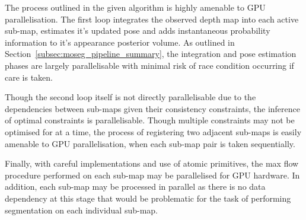 {\begin{minipage}{\linewidth}
\begin{algorithm}[H]
\begin{algorithmic}[1]
           
          \EndFor{}

            \EndFor{}
          \EndIf{}
        \EndProcedure{}
      \end{algorithmic}
    \end{algorithm}
  \end{minipage}
  \par
}

The process outlined in the given algorithm is highly amenable to GPU parallelisation. 
The first loop integrates the observed depth map into each active sub-map, estimates it's updated 
pose and adds instantaneous probability information to it's appearance posterior volume. As 
outlined in Section~\ref{subsec:moseg_pipeline_summary}, the integration and pose estimation phases 
are largely parallelisable with minimal risk of race condition occurring if care is taken.

Though the second loop itself is not directly parallelisable due to the dependencies between sub-maps 
given their consistency constraints, the inference of optimal constraints is parallelisable. Though 
multiple constraints may not be optimised for at a time, the process of registering two adjacent 
sub-maps is easily amenable to GPU parallelisation, when each sub-map pair is taken sequentially.

Finally, with careful implementations and use of atomic primitives, the max flow procedure performed 
on each sub-map may be parallelised for GPU hardware. In addition, each sub-map may be processed in 
parallel as there is no data dependency at this stage that would be problematic for the task of 
performing segmentation on each individual sub-map.

